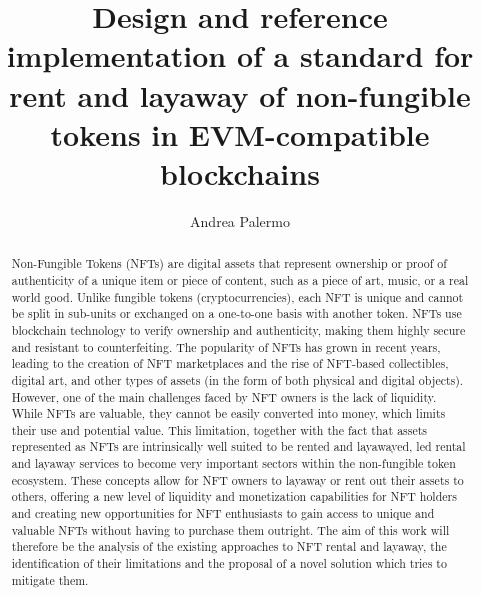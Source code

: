 \documentclass[english, LaM, oneside]{sapthesis}%
\title{Design and reference implementation of a standard for rent and layaway of non-fungible tokens in EVM-compatible blockchains}
\author{Andrea Palermo}
\begin{document}
\frontmatter
\maketitle
\begin{abstract}
\label{chap:abs}
Non-Fungible Tokens (NFTs)\cite{ref:nfts} are digital assets that represent ownership or proof of authenticity of a unique item or piece of content, such as a piece of art, music, or a real world good. Unlike fungible tokens (cryptocurrencies), each NFT is unique and cannot be split in sub-units or exchanged on a one-to-one basis with another token. NFTs use blockchain technology to verify ownership and authenticity, making them highly secure and resistant to counterfeiting. The popularity of NFTs has grown in recent years, leading to the creation of NFT marketplaces and the rise of NFT-based collectibles, digital art, and other types of assets (in the form of both physical and digital objects). However, one of the main challenges faced by NFT owners is the lack of liquidity. While NFTs are valuable, they cannot be easily converted into money, which limits their use and potential value.\newline 
This limitation, together with the fact that assets represented as NFTs are intrinsically well suited to be rented and layawayed, led rental and layaway services to become very important sectors within the non-fungible token ecosystem. These concepts allow for NFT owners to layaway or rent out their assets to others, offering a new level of liquidity and monetization capabilities for NFT holders and creating new opportunities for NFT enthusiasts to gain access to unique and valuable NFTs without having to purchase them outright.\newline 
The aim of this work will therefore be the analysis of the existing approaches to NFT rental and layaway, the identification of their limitations and the proposal of a novel solution which tries to mitigate them.
\end{abstract}

\tableofcontents

\mainmatter
\end{document}
